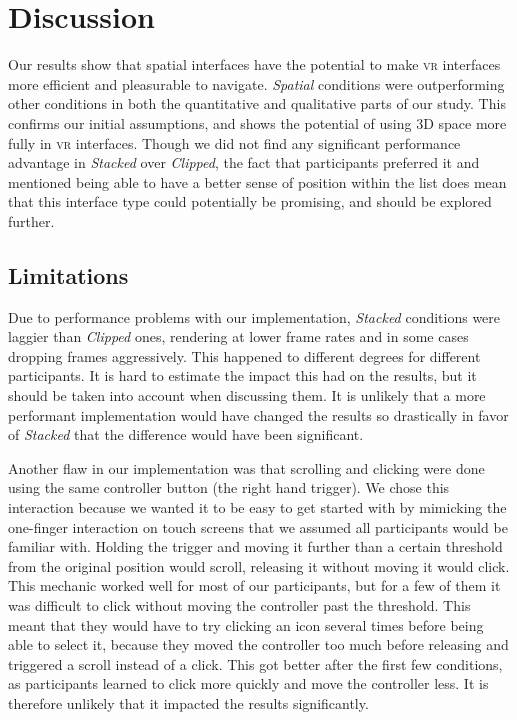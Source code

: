 \documentclass[nobib]{tufte-book} %
\begin{document}

\chapter{Discussion}
\label{ch:discussion}

Our results show that spatial interfaces have the potential to make \textsc{vr} interfaces more efficient and pleasurable to navigate. \emph{Spatial} conditions were outperforming other conditions in both the quantitative and qualitative parts of our study. This confirms our initial assumptions, and shows the potential of using 3D space more fully in \textsc{vr} interfaces. Though we did not find any significant performance advantage in \emph{Stacked} over \emph{Clipped}, the fact that participants preferred it and mentioned being able to have a better sense of position within the list does mean that this interface type could potentially be promising, and should be explored further.

\section{Limitations}
Due to performance problems with our implementation, \emph{Stacked} conditions were laggier than \emph{Clipped} ones, rendering at lower frame rates and in some cases dropping frames aggressively. This happened to different degrees for different participants. It is hard to estimate the impact this had on the results, but it should be taken into account when discussing them. It is unlikely that a more performant implementation would have changed the results so drastically in favor of \emph{Stacked} that the difference would have been significant.

Another flaw in our implementation was that scrolling and clicking were done using the same controller button (the right hand trigger). We chose this interaction because we wanted it to be easy to get started with by mimicking the one-finger interaction on touch screens that we assumed all participants would be familiar with. Holding the trigger and moving it further than a certain threshold from the original position would scroll, releasing it without moving it would click. This mechanic worked well for most of our participants, but for a few of them it was difficult to click without moving the controller past the threshold. This meant that they would have to try clicking an icon several times before being able to select it, because they moved the controller too much before releasing and triggered a scroll instead of a click. This got better after the first few conditions, as participants learned to click more quickly and move the controller less. It is therefore unlikely that it impacted the results significantly.
\end{document}

